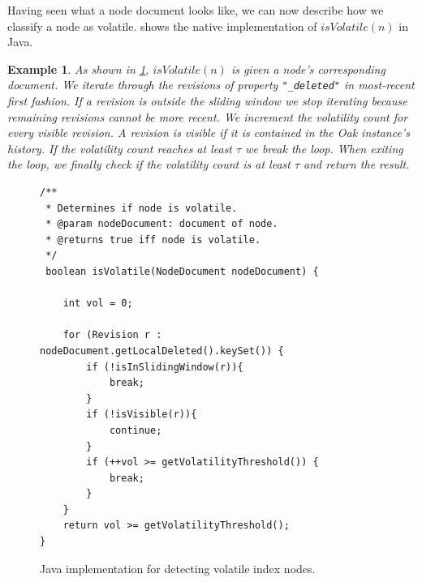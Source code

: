 \documentclass[abstracton,12pt]{scrreprt}
\newtheorem{example}{Example}
\begin{document}
Having seen what a node document looks like, we can now describe how we classify a node as volatile.
 shows the native implementation of $isVolatile(n)$ in Java.
\begin{example}
    As shown in \cref{fig:is_volatile}, $isVolatile(n)$ is given a node's corresponding document.
    We iterate through the revisions of property \texttt{"\_deleted"} in most-recent first fashion.
    If a revision is outside the sliding window we stop iterating because remaining revisions cannot be more recent.
    We increment the volatility count for every visible revision.
    A revision is visible if it is contained in the Oak instance's history.
    If the volatility count reaches at least $\tau$ we break the loop.
    When exiting the loop, we finally check if the volatility count is at least $\tau$ and return the result.
\end{example}

\begin{figure}[h]
    \begin{framed}
        \begin{scriptsize}
            \begin{verbatim}
/**
 * Determines if node is volatile.
 * @param nodeDocument: document of node.
 * @returns true iff node is volatile.
 */            
 boolean isVolatile(NodeDocument nodeDocument) {

    int vol = 0;
    
    for (Revision r : nodeDocument.getLocalDeleted().keySet()) {
        if (!isInSlidingWindow(r)){
            break;
        }
        if (!isVisible(r)){
            continue;
        }
        if (++vol >= getVolatilityThreshold()) {
            break;
        }
    }
    return vol >= getVolatilityThreshold();
}
            \end{verbatim}
        \end{scriptsize}
    \end{framed}
    \caption{Java implementation for detecting volatile index nodes.}
    \label{fig:is_volatile}
\end{figure}
\end{document}
